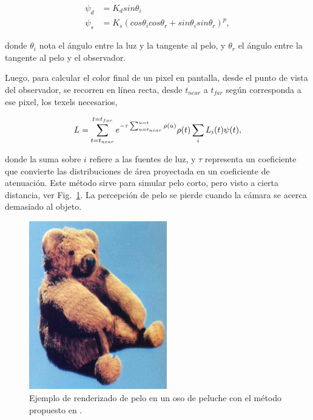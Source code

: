 \begin{align*}
\psi_{d} &= K_{d} sin \theta_{i}\\
\psi_{s} &= K_{s} (cos \theta_{i} cos \theta_{r} + sin \theta_{i} sin \theta_{r})^{p},
\end{align*}

\noindent donde $\theta_{i}$ nota el ángulo entre la luz y la tangente al pelo, y $\theta_{r}$ el ángulo entre la tangente al pelo y el observador.

Luego, para calcular el color final de un pixel en pantalla, desde el punto de vista del observador, se recorren en línea recta, desde $t_{near}$ a $t_{far}$ según corresponda a ese pixel, los texels necesarios,

$$L = \sum_{t=t_{near}}^{t=t_{far}} {e^{-\tau \sum_{u=t_{near}}^{u=t} \rho(u)} \rho(t) \sum_{i} L_{i}(t) \bold{\psi}(t)},$$

\noindent donde la suma sobre $i$ refiere a las fuentes de luz, y $\tau$ representa un coeficiente que convierte las distribuciones de área proyectada en un coeficiente de atenuación.
Este método sirve para simular pelo corto, pero visto a cierta distancia, ver Fig.~\ref{fg:osopelo}.
La percepción de pelo se pierde cuando la cámara se acerca demasiado al objeto.

\begin{figure}
\center
\includegraphics[width=6cm]{figures/osopelo}
\caption[Renderizado de pelo en un oso de peluche]{Ejemplo de renderizado de pelo en un oso de peluche con el método propuesto en \cite{Kajiya1989}.}
\label{fg:osopelo}
\end{figure}


